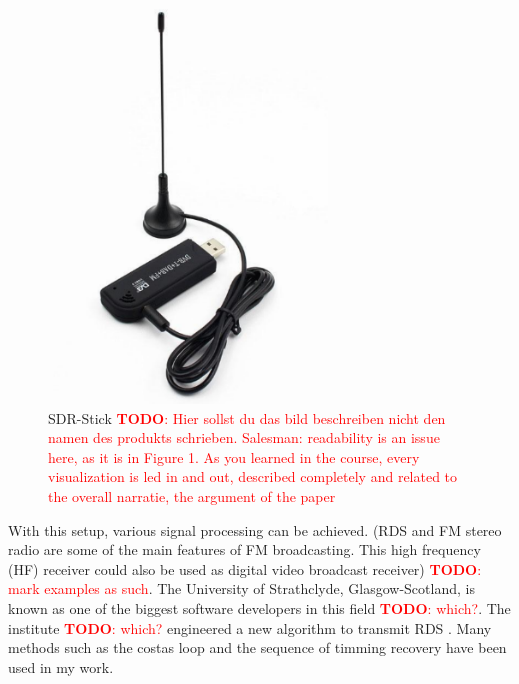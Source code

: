 \documentclass[conference,11pt,a4paper]{IEEEtran}
\newcommand{\todo}[1]{\textcolor{red}{\textbf{TODO}: #1}}
\begin{document}
	
	\begin{figure}[h]
		\centering
		\includegraphics[scale=0.63]{img/SDR-Stick}
		\caption{SDR-Stick \todo{Hier sollst du das bild beschreiben nicht den namen des produkts schrieben. Salesman: readability is an issue here, as it is in Figure 1. As you learned in the course, every visualization is led in and out, described completely and related to the overall narratie, the argument of the paper}}
		\label{fig: receiver}
	\end{figure}
	
	With this setup, various signal processing can be achieved. (RDS and FM stereo radio are some of the main features of  FM broadcasting. This high frequency (HF) receiver could also be used as digital video broadcast receiver) \todo{mark examples as such}. The University of Strathclyde, Glasgow-Scotland, is known as one of the biggest software developers in this field \todo{which?}. The institute \todo{which?} engineered a new algorithm to transmit RDS \cite{stewart2015software}. Many methods such as the costas loop and the sequence of timming recovery have been used in my work.\\
	
\end{document}
